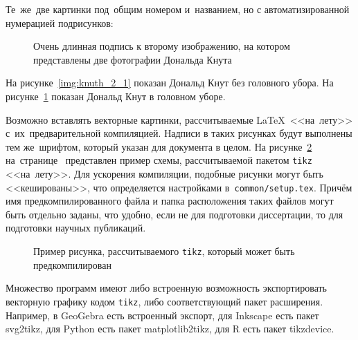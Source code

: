 Те~же~две картинки под~общим номером и~названием, но с автоматизированной нумерацией подрисунков:
\begin{figure}[ht]
    {\centering
        \hfill
        \hfill
        \hfill
        \hfill
    }
    \caption[Этот текст попадает в названия рисунков в списке рисунков]{Очень
    длинная подпись к второму изображению, на котором представлены две
    фотографии Дональда Кнута}
    \label{img:knuth_2}
\end{figure}

На рисунке~\ref{img:knuth_2_1} показан Дональд Кнут без головного убора. На рисунке~\ref{img:knuth_2}  показан Дональд Кнут в головном уборе.

Возможно вставлять векторные картинки, рассчитываемые \LaTeX\ <<на~лету>>
с~их~предварительной компиляцией. Надписи в таких рисунках будут выполнены
тем же~шрифтом, который указан для документа в целом.
На рисунке~\ref{img:tikz_example} на~странице~\pageref{img:tikz_example} представлен пример схемы, рассчитываемой пакетом \verb|tikz| <<на~лету>>.
Для ускорения компиляции, подобные рисунки могут быть <<кешированы>>, что
определяется настройками в~\verb|common/setup.tex|.
Причём имя предкомпилированного
файла и папка расположения таких файлов могут быть отдельно заданы,
что удобно, если не для подготовки диссертации,
то для подготовки научных публикаций.
\begin{figure}[ht]
    {\centering
        

    }
    \legend{}
    \caption[Пример \texttt{tikz} схемы]{Пример рисунка, рассчитываемого
        \texttt{tikz}, который может быть предкомпилирован}
    \label{img:tikz_example}
\end{figure}

Множество программ имеют либо встроенную возможность экспортировать векторную
графику кодом \verb|tikz|, либо соответствующий пакет расширения.
Например, в GeoGebra есть встроенный экспорт,
для Inkscape есть пакет svg2tikz,
для Python есть пакет matplotlib2tikz,
для R есть пакет tikzdevice.


